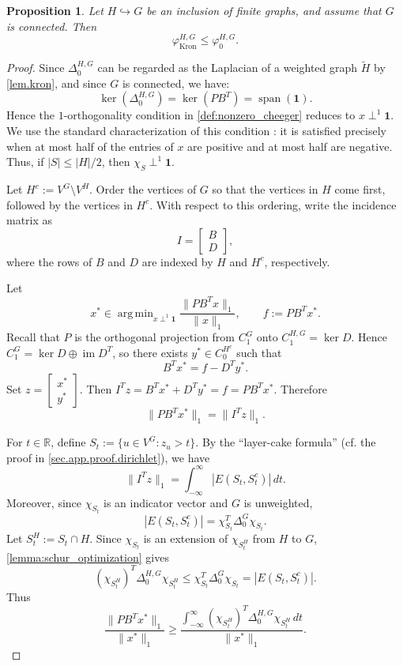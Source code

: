 \documentclass{article}
\newtheorem{proposition}{Proposition}[section]
\newcommand{\one}{\mathbf{1}}
\DeclareMathOperator*{\argmin}{arg\,min}
\begin{document}
\begin{proposition}\label{prop:ineq_cheger_kron_nonzero}
Let \(H\hookrightarrow G\) be an inclusion of finite graphs, and assume that \(G\) is connected. Then
\[
\varphi_{\operatorname{Kron}}^{H,G}\leq \varphi_0^{H,G}.
\]
\end{proposition}

\begin{proof}
Since \(\Delta_0^{H,G}\) can be regarded as the Laplacian of a weighted graph \(\widetilde H\) by \cref{lem.kron}, and since \(G\) is connected, we have:
\[
\ker(\Delta_0^{H,G})=\ker(PB^T)=\operatorname{span}(\one).
\]
Hence the \(1\)-orthogonality condition in \cref{def:nonzero_cheeger} reduces to \(x\perp^1\one\). We use the standard characterization of this condition \cite{MR3433638,MR3600065,MR3403773}: it is satisfied precisely when at most half of the entries of \(x\) are positive and at most half are negative. Thus, if \(|S|\leq |H|/2\), then \(\chi_S\perp^1\one\).

Let \(H^c:=V^G\setminus V^H\). Order the vertices of \(G\) so that the vertices in \(H\) come first, followed by the vertices in \(H^c\). With respect to this ordering, write the incidence matrix as
\[
I=\begin{bmatrix}B\\D\end{bmatrix},
\]
where the rows of \(B\) and \(D\) are indexed by \(H\) and \(H^c\), respectively.

Let
\[
x^*\in \argmin_{x\perp^1\one}\frac{\|PB^Tx\|_1}{\|x\|_1},\qquad f:=PB^Tx^*.
\]
Recall that \(P\) is the orthogonal projection from \(C_1^G\) onto \(C_1^{H,G}=\ker D\). Hence \(C_1^G=\ker D\oplus\operatorname{im}D^T\), so there exists \(y^*\in C_0^{H^c}\) such that
\[
B^Tx^*=f-D^Ty^*.
\]
Set \(z=\begin{bmatrix}x^*\\y^*\end{bmatrix}\). Then \(I^Tz=B^Tx^*+D^Ty^*=f=PB^Tx^*\). Therefore
\[
\|PB^Tx^*\|_1=\|I^Tz\|_1.
\]

For \(t\in\mathbb{R}\), define \(S_t:=\{u\in V^G:z_u>t\}\). By the ``layer-cake formula'' (cf. the proof in \cref{sec.app.proof.dirichlet}), we have
\[
\|I^Tz\|_1=\int_{-\infty}^{\infty}|E(S_t,S_t^c)|\,dt.
\]
Moreover, since \(\chi_{S_t}\) is an indicator vector and $G$ is unweighted,
\[
|E(S_t,S_t^c)|=\chi_{S_t}^T\Delta_0^G\chi_{S_t}.
\]
Let \(S_t^H:=S_t\cap H\). Since \(\chi_{S_t}\) is an extension of \(\chi_{S_t^H}\) from \(H\) to \(G\), \cref{lemma:schur_optimization} gives
\[
(\chi_{S_t^H})^T\Delta_0^{H,G}\chi_{S_t^H}\leq \chi_{S_t}^T\Delta_0^G\chi_{S_t}=|E(S_t,S_t^c)|.
\]
Thus
\[
\frac{\|PB^Tx^*\|_1}{\|x^*\|_1}\geq \frac{\int_{-\infty}^{\infty}(\chi_{S_t^H})^T\Delta_0^{H,G}\chi_{S_t^H}\,dt}{\|x^*\|_1}.
\]


\end{proof}
\end{document}

